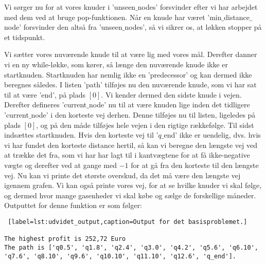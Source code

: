 Vi sørger nu for at vores knuder i 'unseen$\_$nodes' forsvinder efter vi har arbejdet med dem ved at bruge pop-funktionen. Når en knude har været 'min$\_$distance$\_$node' forsvinder den altså fra 'unseen$\_$nodes', så vi sikrer os, at løkken stopper på et tidspunkt. 

Vi sætter vores nuværende knude til at være lig med vores mål.
Derefter danner vi en ny while-løkke, som kører, så længe den nuværende knude ikke er startknuden. Startknuden har nemlig ikke en 'predecessor' og kan dermed ikke beregnes således. I listen 'path' tilføjes nu den nuværende knude, som vi har sat til at være 'end', på plads $[0]$. Vi kender dermed den sidste knude i vejen. Derefter defineres 'current$\_$node' nu til at være knuden lige inden det tidligere 'current$\_$node' i den korteste vej derhen. Denne tilføjes nu til listen, ligeledes på plads $[0]$, og på den måde tilføjes hele vejen i den rigtige rækkefølge. Til sidst indsættes startknuden.
Hvis den korteste vej til '$q\_$end' ikke er uendelig, dvs. hvis vi har fundet den korteste distance hertil, så kan vi beregne den længste vej ved at trække det fra, som vi har har lagt til i kantvægtene for at få ikke-negative vægte og derefter ved at gange med $-1$ for at gå fra den korteste til den længste vej. 
Nu kan vi printe det største overskud, da det må være den længste vej igennem grafen. Vi kan også printe vores vej, for at se hvilke knuder vi skal følge, og dermed hvor mange gasenheder vi skal købe og sælge de forskellige måneder.
Outputtet for denne funktion er som følger:
\begin{lstlisting} [label=lst:udvidet_output,caption=Output for det basisproblemet.]

The highest profit is 252,72 Euro
The path is ['q0.5', 'q1.8', 'q2.4', 'q3.0', 'q4.2', 'q5.6', 'q6.10', 'q7.6', 'q8.10', 'q9.6', 'q10.10', 'q11.10', 'q12.6', 'q_end'].

\end{lstlisting}
